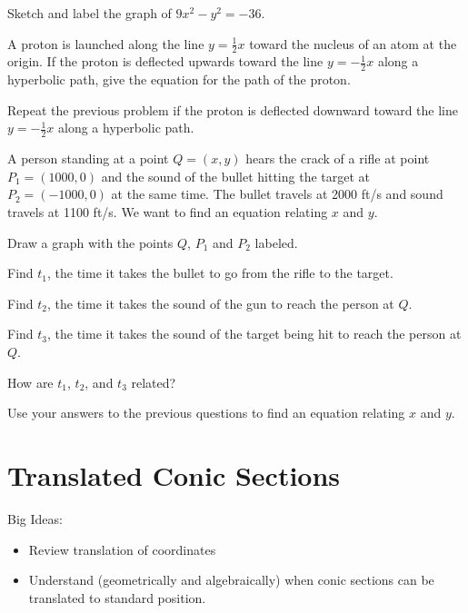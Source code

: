 \bq Sketch and label the graph of $9x^2-y^2=-36$. \eq

\bq  A proton is launched along the line $y = \frac{1}{2} x$ toward the nucleus of an atom at the origin. If the proton is deflected upwards toward the line $y = -\frac{1}{2} x$ along a hyperbolic path, give the equation for the path of the proton. \eq

\bq Repeat the previous problem if the proton is deflected downward toward the line $y = -\frac{1}{2} x$ along a hyperbolic path. \eq

\bq A person standing at a point $Q=(x,y)$ hears the crack of a rifle at point $P_1= (1000,0)$ and the sound of the bullet hitting the target at $P_2=(-1000,0)$ at the same time. The bullet travels at 2000 ft/s and sound travels at 1100 ft/s. We want to find an equation relating $x$ and $y$.
\be
\item Draw a graph with the points $Q$, $P_1$ and $P_2$ labeled.
\item Find $t_1$, the time it takes the bullet to go from the rifle to the target.
\item Find $t_2$, the time it takes the sound of the gun to reach the person at $Q$.
\item Find $t_3$, the time it takes the sound of the target being hit to reach the person at $Q$.
\item How are $t_1$, $t_2$, and $t_3$ related?
\item Use your answers to the previous questions to find an equation relating $x$ and $y$.
\ee
\eq

\section{Translated Conic Sections}
Big Ideas:
\begin{itemize}
\item Review translation of coordinates
\item Understand (geometrically and algebraically) when conic sections can be translated to standard position.
\end{itemize}

